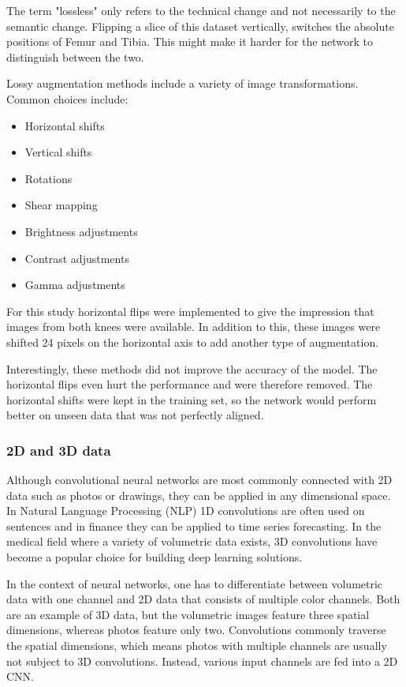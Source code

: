 The term "lossless" only refers to the technical change and not necessarily to the semantic change. Flipping a slice of this dataset vertically, switches the absolute positions of Femur and Tibia. This might make it harder for the network to distinguish between the two.

Lossy augmentation methods include a variety of image transformations. Common choices include:

\begin{itemize}
\item Horizontal shifts
\item Vertical shifts
\item Rotations
\item Shear mapping
\item Brightness adjustments
\item Contrast adjustments
\item Gamma adjustments
\end{itemize}

For this study horizontal flips were implemented to give the impression that images from both knees were available. In addition to this, these images were shifted 24 pixels on the horizontal axis to add another type of augmentation. 

Interestingly, these methods did not improve the accuracy of the model. The horizontal flips even hurt the performance and were therefore removed. The horizontal shifts were kept in the training set, so the network would perform better on unseen data that was not perfectly aligned.

\subsubsection{2D and 3D data}

Although convolutional neural networks are most commonly connected with 2D data such as photos or drawings, they can be applied in any dimensional space. In Natural Language Processing (NLP) 1D convolutions are often used on sentences and in finance they can be applied to time series forecasting. In the medical field where a variety of volumetric data exists, 3D convolutions have become a popular choice for building deep learning solutions.

In the context of neural networks, one has to differentiate between volumetric data with one channel and 2D data that consists of multiple color channels. Both are an example of 3D data, but the volumetric images feature three spatial dimensions, whereas photos feature only two. Convolutions commonly traverse the spatial dimensions, which means photos with multiple channels are usually not subject to 3D convolutions. Instead, various input channels are fed into a 2D CNN.

